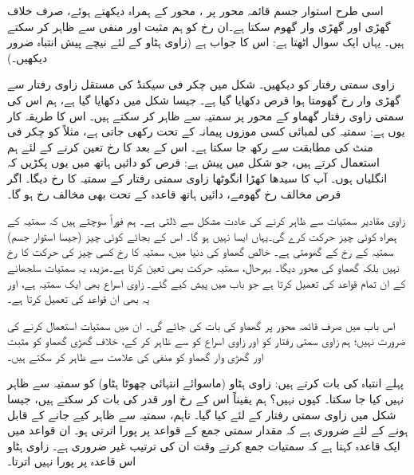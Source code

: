 اسی طرح استوار جسم  قائمہ محور  پر  ، محور کے ہمراہ  دیکھتے ہوئے، صرف خلاف گھڑی اور گھڑی وار   گھوم سکتا ہے۔ان رخ کو ہم مثبت اور منفی سے ظاہر کر سکتے ہیں۔ یہاں ایک سوال اٹھتا ہے:  اس کا جواب ہے  (زاوی ہٹاو کے  لئے   نیچے  پیش انتباہ  ضرور دیکھیں۔)

 زاوی سمتی رفتار کو دیکھیں۔ شکل  میں    چکر فی سیکنڈ  کی   مستقل زاوی رفتار   سے گھڑی وار  رخ  گھومتا ہوا قرص دکھایا گیا ہے۔ جیسا شکل  میں دکھایا گیا ہے، ہم اس کی سمتی زاوی  رفتار  گھماو کے محور پر سمتیہ    سے ظاہر کر سکتے ہیں۔ اس کا طریقہ کار یوں ہے: سمتیہ کی لمبائی   کسی موزوں پیمانہ کے تحت   رکھی جاتی ہے، مثلاً    کو  چکر فی منٹ  کی مطابقت سے رکھ  جا سکتا ہے۔ اس کے بعد  کا رخ تعین کرنے کے لئے ہم استعمال کرتے ہیں، جو شکل  میں پیش ہے: قرص کو دائیں ہاتھ میں یوں پکڑیں کہ  انگلیاں      ہوں۔ آپ کا سیدھا کھڑا انگوٹھا  زاوی سمتی رفتار کے سمتیہ کا رخ دیگا۔ اگر قرص مخالف رخ گھومے، دائیں ہاتھ قاعدہ کے تحت   بھی  مخالف رخ ہو گا۔

زاوی مقادیر       سمتیات سے ظاہر کرنے کی عادت مشکل سے  ڈلتی ہے۔ ہم فوراً سوچتے ہیں  کہ سمتیہ کے  ہمراہ  کوئی چیز  حرکت  کرے گی۔یہاں  ایسا نہیں ہو گا۔  اس کے بجائے کوئی چیز (جیسا استوار جسم) سمتیہ کے رخ کے   گھومتی ہے۔ خالص گھماو کی دنیا میں،  سمتیہ کا رخ کسی چیز کی حرکت کا رخ نہیں بلکہ  گھماو کی محور دیگا۔ بہرحال، سمتیہ حرکت بھی تعین کرتا ہے۔مزید، یہ   سمتیات  سلجھانے کے  ان تمام قواعد کی تعمیل کرتا ہے جو    باب  میں  پیش  کیے گئے۔ زاوی اسراع   بھی ایک  سمتیہ ہے، اور یہ بھی ان قواعد کی تعمیل کرتا ہے۔

اس باب میں صرف   قائمہ محور پر گھماو کی بات کی جائے گی۔ ان میں سمتیات استعمال کرنے کی ضرورت نہیں؛ ہم زاوی سمتی رفتار کو  اور زاوی اسراع کو  سے ظاہر کر  کے، خلاف گھڑی گھماو کو مثبت اور گھڑی وار گھماو کو منفی  کی علامت سے ظاہر کر سکتے ہیں۔

 پہلے  انتباہ کی بات کرتے ہیں: زاوی ہٹاو (ماسوائے  انتہائی چھوٹا  ہٹاو) کو سمتیہ سے ظاہر نہیں کیا جا سکتا۔ کیوں نہیں؟ ہم یقیناً اس کے رخ اور قدر کی بات کر سکتے ہیں، جیسا شکل  میں زاوی سمتی رفتار کے لئے کیا گیا۔ تاہم، سمتیہ سے ظاہر کیے جانے کے قابل ہونے کے لئے ضروری ہے کہ مقدار سمتی جمع کے قواعد پر پورا اترتی  ہو۔ ان قواعد میں ایک قاعدہ کہتا ہے کہ  سمتیات جمع کرتے وقت ان کی ترتیب غیر ضروری ہے۔ زاوی ہٹاو اس قاعدہ پر پورا نہیں اترتا۔

